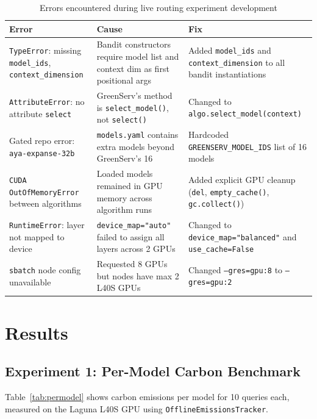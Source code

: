 \documentclass[12pt]{article}
\begin{document}
\begin{table}[H]
\centering
\caption{Errors encountered during live routing experiment development}
\label{tab:errors}
\begin{tabular}{p{3.5cm} p{5.5cm} p{5cm}}
\toprule
\textbf{Error} & \textbf{Cause} & \textbf{Fix} \\
\midrule
\texttt{TypeError}: missing \texttt{model\_ids}, \texttt{context\_dimension} &
Bandit constructors require model list and context dim as first positional args &
Added \texttt{model\_ids} and \texttt{context\_dimension} to all bandit instantiations \\
\addlinespace
\texttt{AttributeError}: no attribute \texttt{select} &
GreenServ's method is \texttt{select\_model()}, not \texttt{select()} &
Changed to \texttt{algo.select\_model(context)} \\
\addlinespace
Gated repo error: \texttt{aya-expanse-32b} &
\texttt{models.yaml} contains extra models beyond GreenServ's 16 &
Hardcoded \texttt{GREENSERV\_MODEL\_IDS} list of 16 models \\
\addlinespace
\texttt{CUDA OutOfMemoryError} between algorithms &
Loaded models remained in GPU memory across algorithm runs &
Added explicit GPU cleanup (\texttt{del}, \texttt{empty\_cache()}, \texttt{gc.collect()}) \\
\addlinespace
\texttt{RuntimeError}: layer not mapped to device &
\texttt{device\_map="auto"} failed to assign all layers across 2 GPUs &
Changed to \texttt{device\_map="balanced"} and \texttt{use\_cache=False} \\
\addlinespace
\texttt{sbatch} node config unavailable &
Requested 8 GPUs but nodes have max 2 L40S GPUs &
Changed \texttt{--gres=gpu:8} to \texttt{--gres=gpu:2} \\
\bottomrule
\end{tabular}
\end{table}

\section{Results}

\subsection{Experiment 1: Per-Model Carbon Benchmark}

Table~\ref{tab:permodel} shows carbon emissions per model for 10 queries
each, measured on the Laguna L40S GPU using
\texttt{OfflineEmissionsTracker}.
\end{document}
